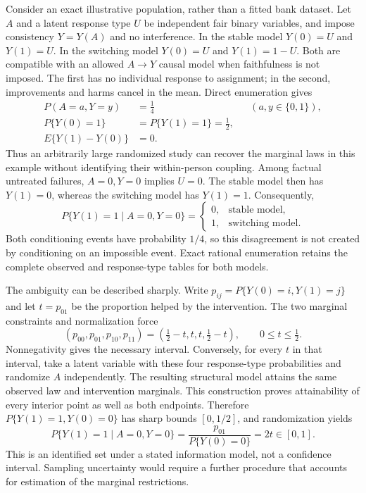 Consider an exact illustrative population, rather than a fitted bank dataset.
Let $A$ and a latent response type $U$ be independent fair binary variables,
and impose consistency $Y=Y(A)$ and no interference. In the stable model
$Y(0)=U$ and $Y(1)=U$. In the switching model $Y(0)=U$ and $Y(1)=1-U$.
Both are compatible with an allowed $A\to Y$ causal model when faithfulness
is not imposed. The first has no individual response to assignment; in the
second, improvements and harms cancel in the mean. Direct enumeration gives
\begin{equation}
\begin{aligned}
 P(A=a,Y=y)&=\tfrac14 &&(a,y\in\{0,1\}),\\
 P\{Y(0)=1\}&=P\{Y(1)=1\}=\tfrac12,\\
 E\{Y(1)-Y(0)\}&=0.
\end{aligned}
\label{exec18:pyid-equal-laws}
\end{equation}
Thus an arbitrarily large randomized study can recover the marginal laws in
this example without identifying their within-person coupling. Among factual
untreated failures, $A=0,Y=0$ implies $U=0$. The stable model then has
$Y(1)=0$, whereas the switching model has $Y(1)=1$. Consequently,
\begin{equation}
 P\{Y(1)=1\mid A=0,Y=0\}=
 \begin{cases}0,&\text{stable model},\\1,&\text{switching model}.\end{cases}
\label{exec18:pyid-conditional}
\end{equation}
Both conditioning events have probability $1/4$, so this disagreement is not
created by conditioning on an impossible event. Exact rational enumeration
retains the complete observed and response-type tables for both models.
\citep{exec18_pyid_coupling}

The ambiguity can be described sharply. Write $p_{ij}=P\{Y(0)=i,Y(1)=j\}$
and let $t=p_{01}$ be the proportion helped by the intervention. The two
marginal constraints and normalization force
\begin{equation}
 (p_{00},p_{01},p_{10},p_{11})
   =\left(\tfrac12-t,t,t,\tfrac12-t\right),
 \qquad 0\leq t\leq\tfrac12.
\label{exec18:pyid-sharp}
\end{equation}
Nonnegativity gives the necessary interval. Conversely, for every $t$ in that
interval, take a latent variable with these four response-type probabilities
and randomize $A$ independently. The resulting structural model attains the
same observed law and intervention marginals. This construction proves
attainability of every interior point as well as both endpoints. Therefore
$P\{Y(1)=1,Y(0)=0\}$ has sharp bounds $[0,1/2]$, and randomization yields
\begin{equation}
 P\{Y(1)=1\mid A=0,Y=0\}
 =\frac{p_{01}}{P\{Y(0)=0\}}=2t\in[0,1].
\label{exec18:pyid-bounds}
\end{equation}
This is an identified set under a stated information model, not a confidence
interval. Sampling uncertainty would require a further procedure that accounts
for estimation of the marginal restrictions.~\citep{exec18_pyid_coupling}

